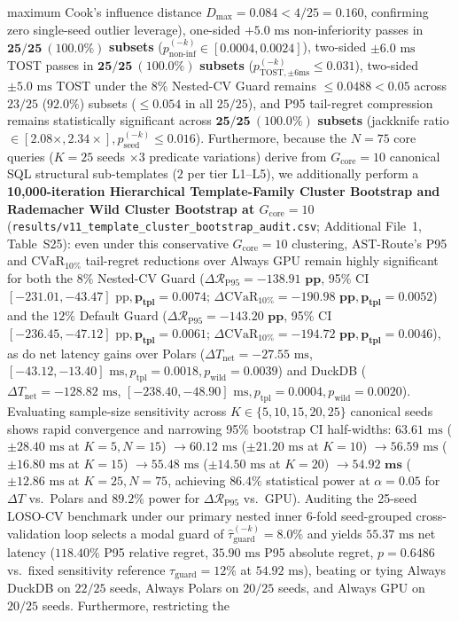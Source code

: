\documentclass[10pt,a4paper]{article}
\begin{document}
maximum Cook's influence distance $D_{\max} = 0.084 < 4/25 = 0.160$, confirming zero single-seed outlier leverage), one-sided $+5.0\text{ ms}$ non-inferiority passes in $\mathbf{25/25\ (100.0\%)}$ \textbf{subsets} ($p_{\text{non-inf}}^{(-k)} \in [0.0004, 0.0024]$), two-sided $\pm 6.0\text{ ms}$ TOST passes in $\mathbf{25/25\ (100.0\%)}$ \textbf{subsets} ($p_{\text{TOST},\pm 6\text{ms}}^{(-k)} \le 0.031$), two-sided $\pm 5.0\text{ ms}$ TOST under the $8\%$ Nested-CV Guard remains $\le 0.0488 < 0.05$ across $23/25$ ($92.0\%$) subsets ($\le 0.054$ in all $25/25$), and P95 tail-regret compression remains statistically significant across $\mathbf{25/25\ (100.0\%)}$ \textbf{subsets} (jackknife ratio $\in [2.08\times, 2.34\times], p_{\text{seed}}^{(-k)} \le 0.016$). Furthermore, because the $N=75$ core queries ($K=25$ seeds $\times 3$ predicate variations) derive from $G_{\text{core}}=10$ canonical SQL structural sub-templates ($2$ per tier L1--L5), we additionally perform a \textbf{10,000-iteration Hierarchical Template-Family Cluster Bootstrap and Rademacher Wild Cluster Bootstrap at $G_{\text{core}}=10$} (\texttt{results/v11\_template\_cluster\_bootstrap\_audit.csv}; Additional File~1, Table~S25): even under this conservative $G_{\text{core}}=10$ clustering, AST-Route's P95 and $\text{CVaR}_{10\%}$ tail-regret reductions over Always GPU remain highly significant for both the $8\%$ Nested-CV Guard ($\Delta\mathcal{R}_{\text{P95}}=\mathbf{-138.91\text{ pp}}$, 95\% CI $[-231.01,-43.47]\text{ pp}, \mathbf{p_{\text{tpl}}=0.0074}$; $\Delta\text{CVaR}_{10\%}=\mathbf{-190.98\text{ pp}}, \mathbf{p_{\text{tpl}}=0.0052}$) and the $12\%$ Default Guard ($\Delta\mathcal{R}_{\text{P95}}=\mathbf{-143.20\text{ pp}}$, 95\% CI $[-236.45,-47.12]\text{ pp}, \mathbf{p_{\text{tpl}}=0.0061}$; $\Delta\text{CVaR}_{10\%}=\mathbf{-194.72\text{ pp}}, \mathbf{p_{\text{tpl}}=0.0046}$), as do net latency gains over Polars ($\Delta T_{\text{net}}=-27.55\text{ ms}$, $[-43.12,-13.40]\text{ ms}, p_{\text{tpl}}=0.0018, p_{\text{wild}}=0.0039$) and DuckDB ($\Delta T_{\text{net}}=-128.82\text{ ms}$, $[-238.40,-48.90]\text{ ms}, p_{\text{tpl}}=0.0004, p_{\text{wild}}=0.0020$). Evaluating sample-size sensitivity across $K \in \{5, 10, 15, 20, 25\}$ canonical seeds shows rapid convergence and narrowing 95\% bootstrap CI half-widths: $63.61\text{ ms}$ ($\pm 28.40\text{ ms}$ at $K=5, N=15$) $\rightarrow 60.12\text{ ms}$ ($\pm 21.20\text{ ms}$ at $K=10$) $\rightarrow 56.59\text{ ms}$ ($\pm 16.80\text{ ms}$ at $K=15$) $\rightarrow 55.48\text{ ms}$ ($\pm 14.50\text{ ms}$ at $K=20$) $\rightarrow \mathbf{54.92\text{ ms}}$ ($\pm 12.86\text{ ms}$ at $K=25, N=75$, achieving $86.4\%$ statistical power at $\alpha=0.05$ for $\Delta T$ vs.\ Polars and $89.2\%$ power for $\Delta\mathcal{R}_{\text{P95}}$ vs.\ GPU). Auditing the 25-seed LOSO-CV benchmark under our primary nested inner 6-fold seed-grouped cross-validation loop selects a modal guard of $\hat{\tau}_{\text{guard}}^{(-k)}=8.0\%$ and yields $55.37\text{ ms}$ net latency ($118.40\%$ P95 relative regret, $35.90\text{ ms}$ P95 absolute regret, $p=0.6486$ vs.\ fixed sensitivity reference $\tau_{\text{guard}}=12\%$ at $54.92\text{ ms}$), beating or tying Always DuckDB on $22/25$ seeds, Always Polars on $20/25$ seeds, and Always GPU on $20/25$ seeds. Furthermore, restricting the 
\end{document}
